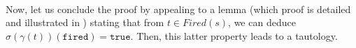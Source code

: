 \begin{itemize}
\begin{enumerate}
   \\

   Now, let us conclude the proof by appealing to a lemma (which proof
   is detailed and illustrated in \cite{Iampietro2021}) stating that
   from $t\in{}Fired(s)$, we can deduce
   $\sigma(\gamma(t))(\texttt{fired})=\mathtt{true}$. Then, this
   latter property leads to a tautology.
         
  \end{enumerate}
\end{itemize}
                                                                         

